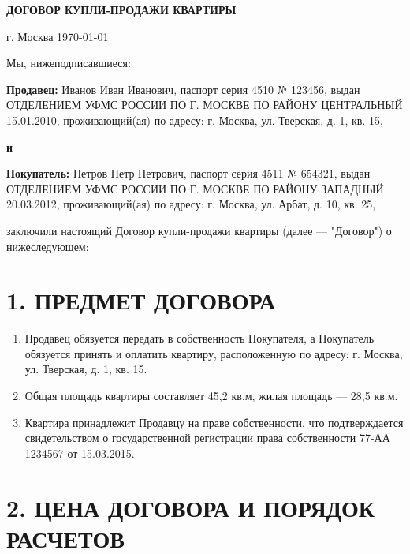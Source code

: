 \documentclass[12pt,a4paper]{article}
\begin{document}
\begin{center}
\textbf{\Large ДОГОВОР КУПЛИ-ПРОДАЖИ КВАРТИРЫ}
\end{center}

\vspace{1cm}

\begin{flushright}
г. Москва \hspace{2cm} \today
\end{flushright}

\vspace{1cm}

Мы, нижеподписавшиеся:

\textbf{Продавец:} Иванов Иван Иванович, паспорт серия 4510 № 123456, выдан ОТДЕЛЕНИЕМ УФМС РОССИИ ПО Г. МОСКВЕ ПО РАЙОНУ ЦЕНТРАЛЬНЫЙ 15.01.2010, проживающий(ая) по адресу: г. Москва, ул. Тверская, д. 1, кв. 15,

\textbf{и}

\textbf{Покупатель:} Петров Петр Петрович, паспорт серия 4511 № 654321, выдан ОТДЕЛЕНИЕМ УФМС РОССИИ ПО Г. МОСКВЕ ПО РАЙОНУ ЗАПАДНЫЙ 20.03.2012, проживающий(ая) по адресу: г. Москва, ул. Арбат, д. 10, кв. 25,

заключили настоящий Договор купли-продажи квартиры (далее — "Договор") о нижеследующем:

\vspace{0.5cm}

\section*{1. ПРЕДМЕТ ДОГОВОРА}

\begin{enumerate}
\item Продавец обязуется передать в собственность Покупателя, а Покупатель обязуется принять и оплатить квартиру, расположенную по адресу: г. Москва, ул. Тверская, д. 1, кв. 15.

\item Общая площадь квартиры составляет 45,2 кв.м, жилая площадь — 28,5 кв.м.

\item Квартира принадлежит Продавцу на праве собственности, что подтверждается свидетельством о государственной регистрации права собственности 77-АА 1234567 от 15.03.2015.
\end{enumerate}

\section*{2. ЦЕНА ДОГОВОРА И ПОРЯДОК РАСЧЕТОВ}
\end{document}
